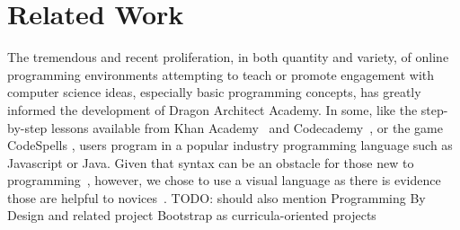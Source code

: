 \documentclass{sig-alternate}
\newcommand{\TODO}[1]{{\color{red} TODO: #1}}
\newcommand{\gametitle}{{\color{RoyalPurple} Dragon Architect Academy}}
\begin{document}



\section{Related Work}
The tremendous and recent proliferation, in both quantity and variety, of online programming environments attempting to teach or promote engagement with computer science ideas, especially basic programming concepts, has greatly informed the development of \gametitle{}.
In some, like the step-by-step lessons available from Khan Academy~\cite{khanacademy} and Codecademy~\cite{codecademy}, or the game CodeSpells \cite{esper2013codespells}, users program in a popular industry programming language such as Javascript or Java.
Given that syntax can be an obstacle for those new to programming~\cite{stefik2013syntax}, however, we chose to use a visual language as there is evidence those are helpful to novices~\cite{whitley1997visual}.
\TODO{should also mention Programming By Design and related project Bootstrap as curricula-oriented projects}
\end{document}
